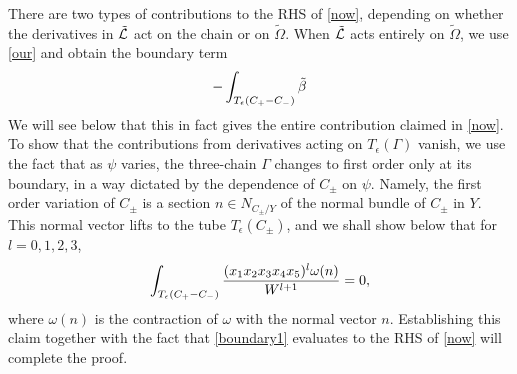 There are two types of contributions to the RHS of \eqref{now}, depending on
whether the derivatives in $\tilde{{\cal L}}$ act on the chain or on $\tilde\Omega$. 
When $\tilde{{\cal L}}$ acts entirely on $\tilde\Omega$, we use \eqref{our} and obtain 
the boundary term
\begin{equation}
\eqlabel{boundary1}
- \int_{T_\epsilon(C_+-C_-)} \tilde\beta
\end{equation}
We will see below that this in fact gives the entire contribution claimed in \eqref{now}.
To show that the contributions from derivatives acting on $T_\epsilon(\Gamma)$ 
vanish, we use the fact that as $\psi$ varies, the three-chain $\Gamma$ changes to 
first order only at its boundary, in a way dictated by the dependence of $C_\pm$ on
$\psi$. Namely, the first order variation of $C_\pm$ is a section $n\in
N_{C_\pm/Y}$ of the normal bundle of $C_\pm$ in $Y$. This normal vector lifts
to the tube $T_\epsilon(C_\pm)$, and we shall show below that for $l=0,1,2,3$,
\begin{equation}
\eqlabel{boundary2}
\int_{T_\epsilon(C_+-C_-)} \frac{(x_1x_2x_3x_4x_5)^l \omega(n)}{W^{l+1}} = 0 ,
\end{equation}
where $\omega(n)$ is the contraction of $\omega$ with the normal vector $n$.
Establishing this claim together with the fact that \eqref{boundary1} evaluates 
to the RHS of \eqref{now} will complete the proof.

